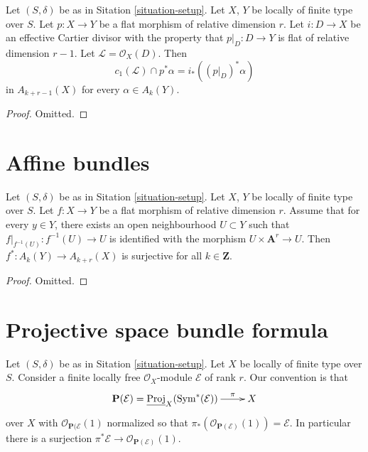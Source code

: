 \begin{lemma}
\label{lemma-relative-effective-cartier}
Let $(S, \delta)$ be as in Sitation \ref{situation-setup}.
Let $X$, $Y$ be locally of finite type over $S$.
Let $p : X \to Y$ be a flat morphism of relative dimension $r$.
Let $i : D \to X$ be an effective Cartier divisor with the property
that $p|_D : D \to Y$ is flat of relative dimension $r - 1$.
Let $\mathcal{L} = \mathcal{O}_X(D)$.
Then
$$
c_1(\mathcal{L}) \cap p^*\alpha = i_* ((p|_D)^*\alpha)
$$
in $A_{k + r - 1}(X)$ for every $\alpha \in A_k(Y)$.
\end{lemma}

\begin{proof}
Omitted.
\end{proof}








\section{Affine bundles}
\label{section-affine-vector}

\begin{lemma}
\label{lemma-pullback-affine-fibres-surjective}
Let $(S, \delta)$ be as in Sitation \ref{situation-setup}.
Let $X$, $Y$ be locally of finite type over $S$.
Let $f : X \to Y$ be a flat morphism of relative dimension $r$.
Assume that for every $y \in Y$, there exists an open neighbourhood
$U \subset Y$ such that $f|_{f^{-1}(U)} : f^{-1}(U) \to U$
is identified with the morphism $U \times \mathbf{A}^r \to U$.
Then $f^* : A_k(Y) \to A_{k + r}(X)$ is surjective for all
$k \in \mathbf{Z}$.
\end{lemma}

\begin{proof}
Omitted.
\end{proof}






\section{Projective space bundle formula}
\label{section-projective-space-bundle-formula}

\noindent
Let $(S, \delta)$ be as in Sitation \ref{situation-setup}.
Let $X$ be locally of finite type over $S$.
Consider a finite locally free $\mathcal{O}_X$-module
$\mathcal{E}$ of rank $r$.
Our convention is that
$$
\xymatrix{
\mathbf{P}(\mathcal{E})
=
\underline{\text{Proj}}_X(\text{Sym}^*(\mathcal{E}))
\ar[r]^-\pi
& X
}
$$
over $X$ with
$\mathcal{O}_{\mathbf{P}(\mathcal{E}}(1)$ normalized so that
$\pi_*(\mathcal{O}_{\mathbf{P}(\mathcal{E})}(1)) = \mathcal{E}$.
In particular there is a surjection
$\pi^*\mathcal{E} \to \mathcal{O}_{\mathbf{P}(\mathcal{E})}(1)$.

